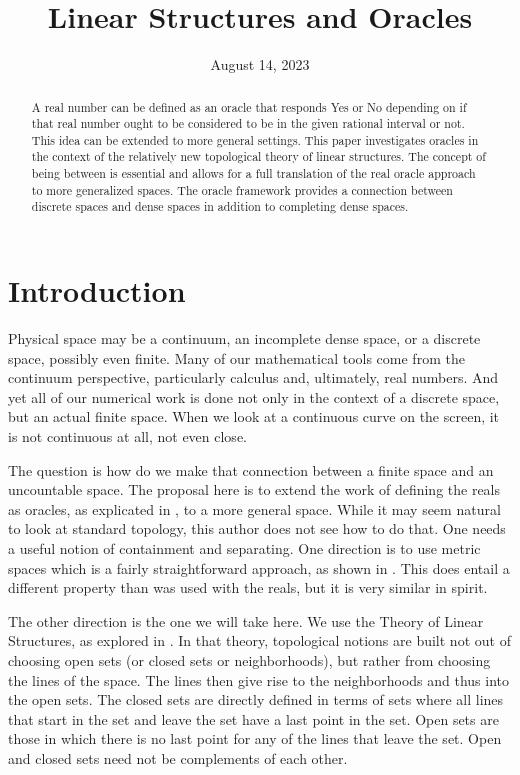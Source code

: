 \documentclass[12pt]{article}
\title{Linear Structures and Oracles}
\date{August 14, 2023}
\begin{document}
\maketitle
\begin{abstract}
A real number can be defined as an oracle that responds Yes or No depending on if that real number ought to be considered to be in the given rational interval or not. This idea can be extended to more general settings. This paper investigates oracles in the context of the relatively new topological theory of linear structures. The concept of being between is essential and allows for a full translation of the real oracle approach to more generalized spaces. The oracle framework provides a connection between discrete spaces and dense spaces in addition to completing dense spaces. 
\end{abstract}

\section{Introduction}

Physical space may be a continuum, an incomplete dense space, or a discrete space, possibly even finite. Many of our mathematical tools come from the continuum perspective, particularly calculus and, ultimately, real numbers. And yet all of our numerical work is done not only in the context of a discrete space, but an actual finite space. When we look at a continuous curve on the screen, it is not continuous at all, not even close. 

The question is how do we make that connection between a finite space and an uncountable space. The proposal here is to extend the work of defining the reals as oracles, as explicated in \cite{taylor23main}, to a more general space. While it may seem natural to look at standard topology, this author does not see how to do that. One needs a useful notion of containment and separating. One direction is to use metric spaces which is a fairly straightforward approach, as shown in \cite{taylor23metric}. This does entail a different property than was used with the reals, but it is very similar in spirit. 

The other direction is the one we will take here. We use the Theory of Linear Structures, as explored in \cite{maudlin}. In that theory, topological notions are built not out of choosing open sets (or closed sets or neighborhoods), but rather from choosing the lines of the space. The lines then give rise to the neighborhoods and thus into the open sets. The closed sets are directly defined in terms of sets where all lines that start in the set and leave the set have a last point in the set. Open sets are those in which there is no last point for any of the lines that leave the set. Open and closed sets need not be complements of each other. 
\end{document}
